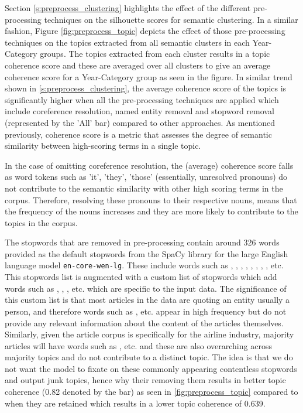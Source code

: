 Section \ref{s:preprocess_clustering} highlights the effect of the different pre-processing techniques on the silhouette scores for semantic clustering. In a similar fashion, Figure \ref{fig:preprocess_topic} depicts the effect of those pre-processing techniques on the topics extracted from all semantic clusters in each Year-Category groups. The topics extracted from each cluster results in a topic coherence score and these are averaged over all clusters to give an average coherence score for a Year-Category group as seen in the figure. In similar trend shown in \ref{s:preprocess_clustering}, the average coherence score of the topics is significantly higher when all the pre-processing techniques are applied which include coreference resolution, named entity removal and stopword removal (represented by the 'All' bar) compared to other approaches. As mentioned previously, coherence score is a metric that assesses the degree of semantic similarity between high-scoring terms in a single topic.

In the case of omitting coreference resolution, the (average) coherence score falls as word tokens such as 'it', 'they', 'those' (essentially, unresolved pronouns) do not contribute to the semantic similarity with other high scoring terms in the corpus. Therefore, resolving these pronouns to their respective nouns, means that the frequency of the nouns increases and they are more likely to contribute to the topics in the corpus. 

The stopwords that are removed in pre-processing contain around 326 words provided as the default stopwords from the SpaCy library for the large English language model \texttt{en-core-wen-lg}. These include words such as , , , , , , , ,  etc. This stopwords list is augmented with a custom list of stopwords which add words such as , , ,  etc. which are specific to the input data. The significance of this custom list is that most articles in the data are quoting an entity usually a person, and therefore words such as  ,  etc. appear in high frequency but do not provide any relevant information about the content of the articles themselves. Similarly, given the article corpus is specifically for the airline industry, majority articles will have words such as ,  etc. and these are also overarching across majority topics and do not contribute to a distinct topic. The idea is that we do not want the model to fixate on these commonly appearing contentless stopwords and output junk topics, hence why their removing them results in better topic coherence (0.82 denoted by the  bar) as seen in \ref{fig:preprocess_topic} compared to when they are retained which results in a lower topic coherence of 0.639. 

